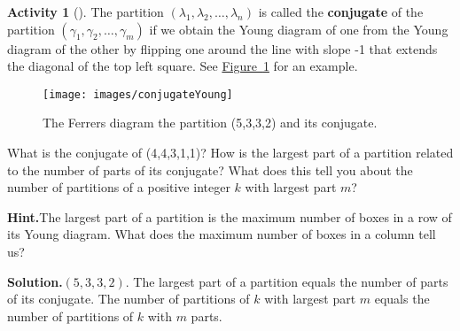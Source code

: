 \documentclass[10pt,]{book}
\newcommand{\terminology}[1]{\textbf{#1}}
\theoremstyle{plain}
\theoremstyle{definition}
\newtheorem{activity}[project]{Activity}
\numberwithin{equation}{chapter}
\begin{document}
\begin{activity}[]\label{activity-152}
The partition \((\lambda_1,\lambda_2,\ldots, \lambda_n)\) is called the \terminology{conjugate} of the partition \((\gamma_1,\gamma_2,\ldots, \gamma_m)\) if we obtain the Young diagram of one from the Young diagram of the other by flipping one around the line with slope -1 that extends the diagonal of the top left square. See \hyperref[conjugateYoung]{Figure~\ref{conjugateYoung}} for an example.%
\begin{figure}
\centering
\texttt{[image: images/conjugateYoung]}
\caption{The Ferrers diagram the partition (5,3,3,2) and its conjugate.\label{conjugateYoung}}
\end{figure}
What is the conjugate of (4,4,3,1,1)? How is the largest part of a partition related to the number of parts of its conjugate? What does this tell you about the number of partitions of a positive integer \(k\) with largest part \(m\)?%
\par\medskip\noindent%
\textbf{Hint.}\quad The largest part of a partition is the maximum number of boxes in a row of its Young diagram. What does the maximum number of boxes in a column tell us?%
\par\medskip\noindent%
\textbf{Solution.}\quad \((5,3,3,2)\). The largest part of a partition equals the number of parts of its conjugate. The number of partitions of \(k\) with largest part \(m\) equals the number of partitions of \(k\) with \(m\) parts.%
\end{activity}
\end{document}
